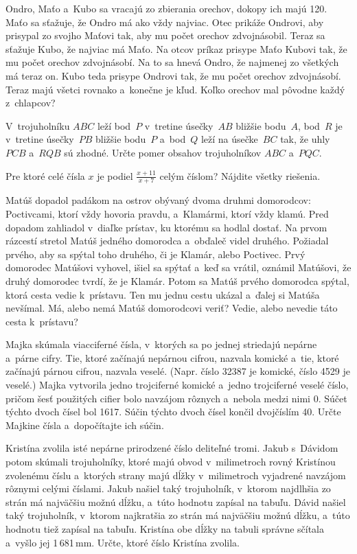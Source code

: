 {%
Ondro, Maťo a~Kubo sa vracajú zo zbierania orechov, dokopy ich majú 120.
Maťo sa sťažuje, že Ondro má ako vždy najviac.
Otec prikáže Ondrovi, aby prisypal zo svojho Maťovi tak, aby mu počet orechov zdvojnásobil.
Teraz sa sťažuje Kubo, že najviac má Maťo.
Na otcov príkaz prisype Maťo Kubovi tak, že mu počet orechov zdvojnásobí.
Na to sa hnevá Ondro, že najmenej zo všetkých má teraz on.
Kubo teda prisype Ondrovi tak, že mu počet orechov zdvojnásobí.
Teraz majú všetci rovnako a~konečne je kľud.
Koľko orechov mal pôvodne každý z~chlapcov?
}

{%
V~trojuholníku $ABC$ leží bod~$P$ v~tretine úsečky~$AB$ bližšie bodu~$A$, bod~$R$ je v~tretine úsečky~$PB$ bližšie bodu~$P$ a~bod~$Q$ leží na úsečke~$BC$ tak, že uhly $PCB$ a~$RQB$ sú zhodné.
Určte pomer obsahov trojuholníkov $ABC$ a~$PQC$.
}

{%
Pre ktoré celé čísla $x$ je podiel $\displaystyle\frac{x+11}{x+7}$ celým číslom?
Nájdite všetky riešenia.
}

{%
Matúš dopadol padákom na ostrov obývaný dvoma druhmi domorodcov: Poctivcami, ktorí vždy hovoria pravdu, a~Klamármi, ktorí vždy klamú.
Pred dopadom zahliadol v~diaľke prístav, ku ktorému sa hodlal dostať.
Na prvom rázcestí stretol Matúš jedného domorodca a~obďaleč videl druhého.
Požiadal prvého, aby sa spýtal toho druhého, či je Klamár, alebo Poctivec.
Prvý domorodec Matúšovi vyhovel, išiel sa spýtať a~keď sa vrátil, oznámil Matúšovi, že druhý domorodec tvrdí, že je Klamár.
Potom sa Matúš prvého domorodca spýtal, ktorá cesta vedie k~prístavu.
Ten mu jednu cestu ukázal a~ďalej si Matúša nevšímal.
Má, alebo nemá Matúš domorodcovi veriť?
Vedie, alebo nevedie táto cesta k~prístavu?
}

{%
Majka skúmala viacciferné čísla, v~ktorých sa po jednej striedajú nepárne a~párne cifry.
Tie, ktoré začínajú nepárnou cifrou, nazvala komické a~tie, ktoré začínajú párnou cifrou, nazvala veselé.
(Napr. číslo 32387 je komické, číslo 4529 je veselé.)
Majka vytvorila jedno trojciferné komické a~jedno trojciferné veselé číslo, pričom šesť použitých cifier bolo navzájom rôznych a~nebola medzi nimi 0.
Súčet týchto dvoch čísel bol 1617.
Súčin týchto dvoch čísel končil dvojčíslím 40.
Určte Majkine čísla a~dopočítajte ich súčin.
}

{%
Kristína zvolila isté nepárne prirodzené číslo deliteľné tromi.
Jakub s~Dávidom potom skúmali trojuholníky, ktoré majú obvod v~milimetroch rovný Kristínou zvolenému číslu a~ktorých strany majú dĺžky v~milimetroch vyjadrené navzájom rôznymi celými číslami.
Jakub našiel taký trojuholník, v~ktorom najdlhšia zo strán má najväčšiu možnú dĺžku, a~túto hodnotu zapísal na tabuľu.
Dávid našiel taký trojuholník, v~ktorom najkratšia zo strán má najväčšiu možnú dĺžku, a~túto hodnotu tiež zapísal na tabuľu.
Kristína obe dĺžky na tabuli správne sčítala a~vyšlo jej 1\,681\,mm.
Určte, ktoré číslo Kristína zvolila.
}

